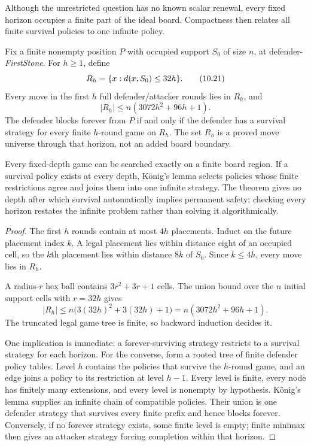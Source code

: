 Although the unrestricted question has no known scalar renewal, every fixed
horizon occupies a finite part of the ideal board.  Compactness then relates
all finite survival policies to one infinite policy.

\begin{theorem}
\label{thm:ES-finite-reduction}
Fix a finite nonempty position $P$ with occupied support $S_0$ of size $n$, at
defender-\emph{FirstStone}.  For $h\geq1$, define
\[
 R_h=\{x:d(x,S_0)\leq32h\}.
\tag{10.21}
\]
Every move in the first $h$ full defender/attacker rounds lies in $R_h$, and
\[
 |R_h|\leq n(3072h^2+96h+1).
\tag{10.22}
\]
The defender blocks forever from $P$ if and only if the defender has a
survival strategy for every finite $h$-round game on $R_h$.  The set $R_h$ is
a proved move universe through that horizon, not an added board boundary.
\end{theorem}

\begin{plainterms}
Every fixed-depth game can be searched exactly on a finite board region.  If a
survival policy exists at every depth, K\"onig's lemma selects policies whose
finite restrictions agree and joins them into one infinite strategy.  The
theorem gives no depth after which survival automatically implies permanent
safety; checking every horizon restates the infinite problem rather than
solving it algorithmically.
\end{plainterms}

\begin{proof}
The first $h$ rounds contain at most $4h$ placements.  Induct on the future
placement index $k$.  A legal placement lies within distance eight of an
occupied cell, so the $k$th placement lies within distance $8k$ of $S_0$.
Since $k\leq4h$, every move lies in $R_h$.

A radius-$r$ hex ball contains $3r^2+3r+1$ cells.  The union bound over the
$n$ initial support cells with $r=32h$ gives
\[
 |R_h|\leq n\bigl(3(32h)^2+3(32h)+1\bigr)
 =n(3072h^2+96h+1).
\]
The truncated legal game tree is finite, so backward induction decides it.

One implication is immediate: a forever-surviving strategy restricts to a
survival strategy for each horizon.  For the converse, form a rooted tree of
finite defender policy tables.  Level $h$ contains the policies that survive
the $h$-round game, and an edge joins a policy to its restriction at level
$h-1$.  Every level is finite, every node has finitely many extensions, and
every level is nonempty by hypothesis.  K\"onig's lemma supplies an infinite
chain of compatible policies.  Their union is one defender strategy that
survives every finite prefix and hence blocks forever.  Conversely, if no
forever strategy exists, some finite level is empty; finite minimax then gives
an attacker strategy forcing completion within that horizon.
\end{proof}

